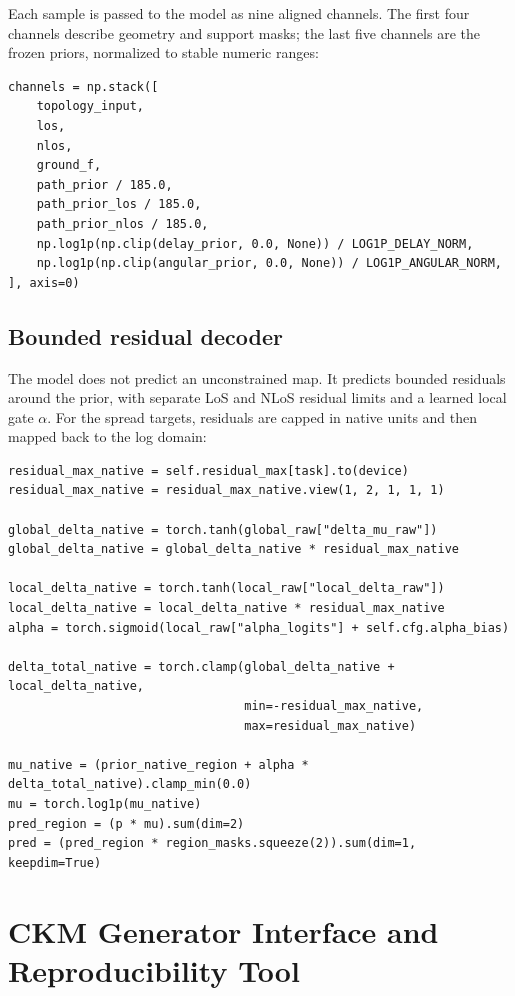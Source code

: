 Each sample is passed to the model as nine aligned channels. The first four
channels describe geometry and support masks; the last five channels are the
frozen priors, normalized to stable numeric ranges:

{\scriptsize
\begin{verbatim}
channels = np.stack([
    topology_input,
    los,
    nlos,
    ground_f,
    path_prior / 185.0,
    path_prior_los / 185.0,
    path_prior_nlos / 185.0,
    np.log1p(np.clip(delay_prior, 0.0, None)) / LOG1P_DELAY_NORM,
    np.log1p(np.clip(angular_prior, 0.0, None)) / LOG1P_ANGULAR_NORM,
], axis=0)
\end{verbatim}
}

\section{Bounded residual decoder}

The model does not predict an unconstrained map. It predicts bounded residuals
around the prior, with separate LoS and NLoS residual limits and a learned
local gate \(\alpha\). For the spread targets, residuals are capped in native
units and then mapped back to the log domain:

{\scriptsize
\begin{verbatim}
residual_max_native = self.residual_max[task].to(device)
residual_max_native = residual_max_native.view(1, 2, 1, 1, 1)

global_delta_native = torch.tanh(global_raw["delta_mu_raw"])
global_delta_native = global_delta_native * residual_max_native

local_delta_native = torch.tanh(local_raw["local_delta_raw"])
local_delta_native = local_delta_native * residual_max_native
alpha = torch.sigmoid(local_raw["alpha_logits"] + self.cfg.alpha_bias)

delta_total_native = torch.clamp(global_delta_native + local_delta_native,
                                 min=-residual_max_native,
                                 max=residual_max_native)

mu_native = (prior_native_region + alpha * delta_total_native).clamp_min(0.0)
mu = torch.log1p(mu_native)
pred_region = (p * mu).sum(dim=2)
pred = (pred_region * region_masks.squeeze(2)).sum(dim=1, keepdim=True)
\end{verbatim}
}

\chapter{CKM Generator Interface and Reproducibility Tool}
\label{chap:ckm_generator}
\label{app:ckm_generator}

